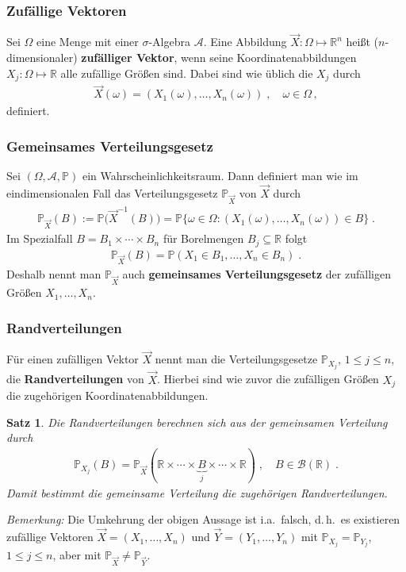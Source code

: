 \documentclass[ngerman,draft,parskip=half,twoside]{scrartcl}
\newtheorem{thm}{Satz}[section]
\newcommand*{\R}{\mathbb{R}}      %
\newcommand*{\Algeb}{\mathcal{A}}   %
\newcommand*{\BorelM}{\mathcal{B}}  %
\newcommand*{\WKM}{\mathbb{P}}      %
\begin{document}
\subsubsection{Zufällige Vektoren}
Sei $\Omega$ eine Menge mit einer $\sigma$-Algebra $\Algeb$. Eine Abbildung $\vec X \colon \Omega\mapsto\R^n$
heißt ($n$-dimensionaler) \textbf{zufälliger Vektor}, wenn seine Koordinatenabbildungen
$X_j \colon\Omega\mapsto \R$ alle zufällige Größen sind. Dabei sind wie üblich die $X_j$ durch
\begin{gather*}
  \vec X(\omega)=(X_1(\omega),\ldots,X_n(\omega))\;,\quad \omega\in\Omega\,,
\end{gather*}
definiert.

\subsubsection{Gemeinsames Verteilungsgesetz}
Sei $(\Omega,\Algeb,\WKM)$ ein Wahrscheinlichkeitsraum. Dann definiert
man wie im eindimensionalen Fall das Verteilungsgesetz $\WKM_{\vec X}$ von $\vec X$
durch
\begin{gather*}
  \WKM_{\vec X}(B):=\WKM\big(\vec X^{-1}(B)\big)=\WKM\{\omega\in\Omega \colon (X_1(\omega),\ldots,X_n(\omega))\in B\}\;.
\end{gather*}
Im Spezialfall $B=B_1\times\cdots\times B_n$ für Borelmengen $B_j\subseteq\R$ folgt
\begin{gather*}
  \WKM_{\vec X}(B)=\WKM(X_1\in B_1,\ldots, X_n\in B_n)\;.
\end{gather*}
Deshalb nennt man $\WKM_{\vec X}$ auch \textbf{gemeinsames Verteilungsgesetz} der zufälligen
Größen $X_1,\ldots,X_n$.
\subsubsection{Randverteilungen}
Für einen zufälligen Vektor $\vec X$ nennt man die Verteilungsgesetze $\WKM_{X_j}$, $1\le j\le n$,
die \textbf{Randverteilungen} von $\vec X$. Hierbei sind wie zuvor die zufälligen Größen $X_j$ die
zugehörigen Koordinatenabbildungen.
\begin{thm}
Die Randverteilungen berechnen sich aus der gemeinsamen Verteilung durch
  \begin{gather*}
    \WKM_{X_j}(B)= \WKM_{\vec X}(\R\times\cdots\times \underbrace{B}_j\times\cdots\times\R)\;,\quad B\in\BorelM(\R)\;.
  \end{gather*}
Damit bestimmt die gemeinsame Verteilung die zugehörigen Randverteilungen.
\end{thm}
\textit{Bemerkung:} Die Umkehrung der obigen Aussage ist i.a.~falsch, d.\,h.~es existieren zufällige
Vektoren $\vec X=(X_1,\ldots,X_n)$ und $\vec Y=(Y_1,\ldots, Y_n)$ mit $\WKM_{X_j}=\WKM_{Y_j}$,
$1\le j\le n$, aber mit $\WKM_{\vec X}\not=\WKM_{\vec Y}$.
\end{document}
